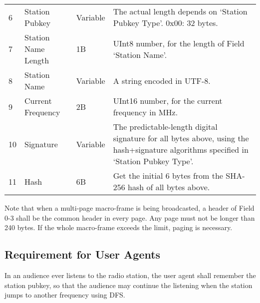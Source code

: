 \documentclass[a4paper,11pt]{article}
\begin{document}
\begin{tabu}{lllX}
	6     & Station Pubkey      & Variable & {The actual length depends on `Station Pubkey Type'. 0x00: 32 bytes.}                                                                                                                                                                                                                                                     \\
	7     & Station Name Length & 1B       & {UInt8 number, for the length of Field `Station Name'.}                                                                                                                                                                                                                                                                   \\
	8     & Station Name        & Variable & {A string encoded in UTF-8.}                                                                                                                                                                                                                                                                                              \\
	9     & Current Frequency   & 2B       & {UInt16 number, for the current frequency in MHz.}                                                                                                                                                                                                                                                                        \\
	10    & Signature           & Variable & {The predictable-length digital signature for all bytes above, using the hash+signature algorithms specified in `Station Pubkey Type'.}                                                                                                                                                                                   \\
	11    & Hash                & 6B       & {Get the initial 6 bytes from the SHA-256 hash of all bytes above.}                                                                                                                                                                                                                                                       \\
	\bottomrule
\end{tabu}

Note that when a multi-page macro-frame is being broadcasted, a header of Field 0-3 shall be the common header in every page.
Any page must not be longer than 240 bytes.
If the whole macro-frame exceeds the limit, paging is necessary.


\subsection{Requirement for User Agents}

In an audience ever listens to the radio station, the user agent shall remember the station pubkey,
so that the audience may continue the listening when the station jumps to another frequency using DFS.
\end{document}

